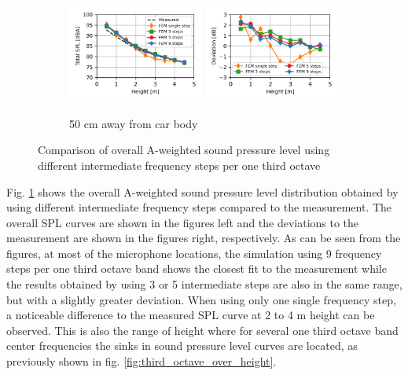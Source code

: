 \begin{figure}[H]\ContinuedFloat
	\begin{subfigure}[b]{\textwidth}
		\centering
		\includegraphics[width=0.49\textwidth]{fig/chap5/freq_steps/overall_SPL/pos_f.png}
		\includegraphics[width=0.49\textwidth]{fig/chap5/freq_steps/overall_SPL/pos_f_deviation.png}
		\caption{50 cm away from car body}
	\end{subfigure}
	\caption{Comparison of overall A-weighted sound pressure level using different intermediate frequency steps per one third octave}
	\label{fig:overall_SPL_freq_steps}
\end{figure}

Fig. \ref{fig:overall_SPL_freq_steps} shows the overall A-weighted sound pressure level distribution obtained by using different intermediate frequency steps compared to the measurement. The overall SPL curves are shown in the figures left and the deviations to the measurement are shown in the figures right, respectively. As can be seen from the figures, at most of the microphone locations, the simulation using 9 frequency steps per one third octave band shows the closest fit to the measurement while the results obtained by using 3 or 5 intermediate steps are also in the same range, but with a slightly greater deviation. When using only one single frequency step, a noticeable difference to the measured SPL curve at 2 to 4 m height can be observed. This is also the range of height where for several one third octave band center frequencies the sinks in sound pressure level curves are located, as previously shown in fig. \ref{fig:third_octave_over_height}.

